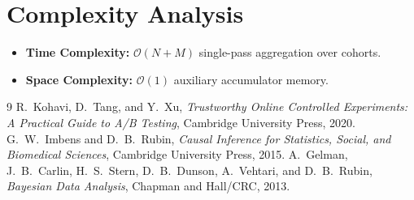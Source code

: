 \documentclass[11pt,a4paper]{article}
\theoremstyle{definition}
\begin{document}
\section{Complexity Analysis}
\begin{itemize}
    \item \textbf{Time Complexity:} $\mathcal{O}(N + M)$ single-pass aggregation over cohorts.
    \item \textbf{Space Complexity:} $\mathcal{O}(1)$ auxiliary accumulator memory.
\end{itemize}

\begin{thebibliography}{9}
 R.~Kohavi, D.~Tang, and Y.~Xu, \emph{Trustworthy Online Controlled Experiments: A Practical Guide to A/B Testing}, Cambridge University Press, 2020.
 G.~W.~Imbens and D.~B.~Rubin, \emph{Causal Inference for Statistics, Social, and Biomedical Sciences}, Cambridge University Press, 2015.
 A.~Gelman, J.~B.~Carlin, H.~S.~Stern, D.~B.~Dunson, A.~Vehtari, and D.~B.~Rubin, \emph{Bayesian Data Analysis}, Chapman and Hall/CRC, 2013.
\end{thebibliography}
\end{document}
